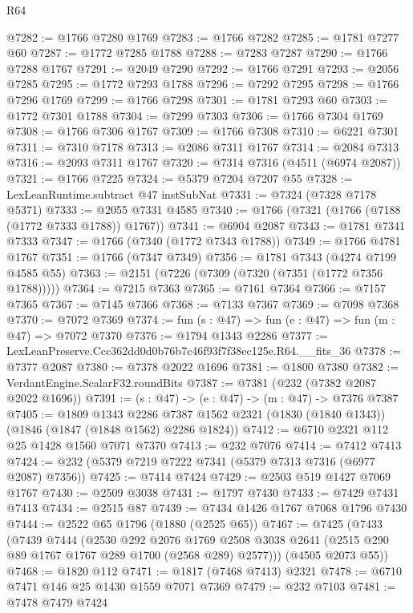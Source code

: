 \begin{lexlean}{R64}
\begin{coremodule}
@7282 := @1766 @7280 @1769
@7283 := @1766 @7282
@7285 := @1781 @7277 @60
@7287 := @1772 @7285 @1788
@7288 := @7283 @7287
@7290 := @1766 @7288 @1767
@7291 := @2049 @7290
@7292 := @1766 @7291
@7293 := @2056 @7285
@7295 := @1772 @7293 @1788
@7296 := @7292 @7295
@7298 := @1766 @7296 @1769
@7299 := @1766 @7298
@7301 := @1781 @7293 @60
@7303 := @1772 @7301 @1788
@7304 := @7299 @7303
@7306 := @1766 @7304 @1769
@7308 := @1766 @7306 @1767
@7309 := @1766 @7308
@7310 := @6221 @7301
@7311 := @7310 @7178
@7313 := @2086 @7311 @1767
@7314 := @2084 @7313
@7316 := @2093 @7311 @1767
@7320 := @7314 @7316 (@4511 (@6974 @2087))
@7321 := @1766 @7225
@7324 := @5379 @7204 @7207 @55
@7328 := LexLeanRuntime.subtract @47 instSubNat
@7331 := @7324 (@7328 @7178 @5371)
@7333 := @2055 @7331 @4585
@7340 := @1766 (@7321 (@1766 (@7188 (@1772 @7333 @1788)) @1767))
@7341 := @6904 @2087
@7343 := @1781 @7341 @7333
@7347 := @1766 (@7340 (@1772 @7343 @1788))
@7349 := @1766 @4781 @1767
@7351 := @1766 (@7347 @7349)
@7356 := @1781 @7343 (@4274 @7199 @4585 @55)
@7363 := @2151 (@7226 (@7309 (@7320 (@7351 (@1772 @7356 @1788)))))
@7364 := @7215 @7363
@7365 := @7161 @7364
@7366 := @7157 @7365
@7367 := @7145 @7366
@7368 := @7133 @7367
@7369 := @7098 @7368
@7370 := @7072 @7369
@7374 := fun (s : @47) => fun (e : @47) => fun (m : @47) => @7072 @7370
@7376 := @1794 @1343 @2286
@7377 := LexLeanPreserve.Ccc362dd0d0b76b7c46f93f7f38ec125e.R64.__fits_36
@7378 := @7377 @2087
@7380 := @7378 @2022 @1696
@7381 := @1800 @7380
@7382 := VerdantEngine.ScalarF32.roundBits
@7387 := @7381 (@232 (@7382 @2087 @2022 @1696))
@7391 := (s : @47) -> (e : @47) -> (m : @47) -> @7376 @7387
@7405 := @1809
    @1343
    @2286
    @7387
    @1562
    @2321
    (@1830 (@1840 @1343))
    (@1846 (@1847 (@1848 @1562) @2286 @1824))
@7412 := @6710 @2321 @112 @25 @1428 @1560 @7071 @7370
@7413 := @232 @7076
@7414 := @7412 @7413
@7424 := @232 (@5379 @7219 @7222 @7341 (@5379 @7313 @7316 (@6977 @2087) @7356))
@7425 := @7414 @7424
@7429 := @2503 @519 @1427 @7069 @1767
@7430 := @2509 @3038
@7431 := @1797 @7430
@7433 := @7429 @7431 @7413
@7434 := @2515 @87
@7439 := @7434 @1426 @1767 @7068 @1796 @7430
@7444 := @2522 @65 @1796 (@1880 (@2525 @65))
@7467 := @7425
    (@7433
      (@7439
        @7444
        (@2530
          @292
          @2076
          @1769
          @2508
          @3038
          @2641
          (@2515 @290 @89 @1767 @1767 @289 @1700 (@2568 @289) @2577)))
      (@4505 @2073 @55))
@7468 := @1820 @112
@7471 := @1817 (@7468 @7413) @2321
@7478 := @6710 @7471 @146 @25 @1430 @1559 @7071 @7369
@7479 := @232 @7103
@7481 := @7478 @7479 @7424

\end{coremodule}
\end{lexlean}
